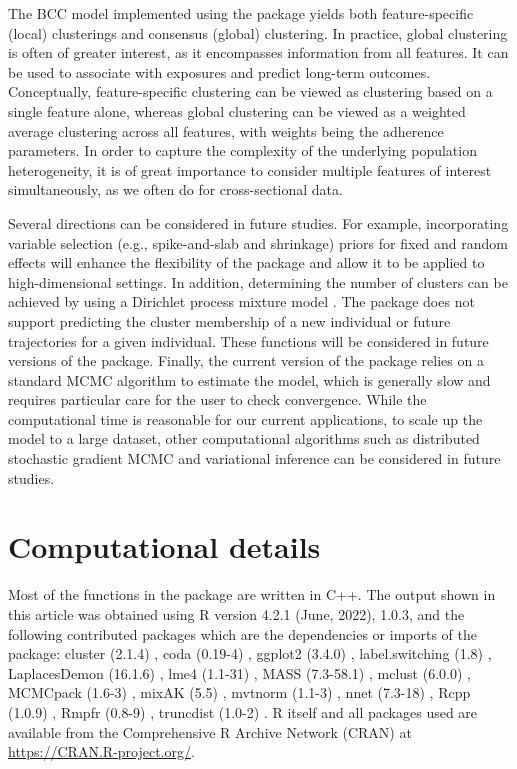The BCC model implemented using the  package yields both feature-specific (local) clusterings and consensus (global) clustering. In practice, global clustering is often of greater interest, as it encompasses information from all features. It can be used to associate with exposures and predict long-term outcomes. Conceptually, feature-specific clustering can be viewed as clustering based on a single feature alone, whereas global clustering can be viewed as a weighted average clustering across all features, with weights being the adherence parameters. In order to capture the complexity of the underlying population heterogeneity, it is of great importance to consider multiple features of interest simultaneously, as we often do for cross-sectional data. 

Several directions can be considered in future studies. For example, incorporating variable selection (e.g., spike-and-slab and shrinkage) priors \citep{Lu2021b, Lu2021} for fixed and random effects will enhance the flexibility of the package and allow it to be applied to high-dimensional settings. In addition, determining the number of clusters can be achieved by using a Dirichlet process mixture model \citep{Escobar1994, Lu2023a, Lu2024}. The package does not support predicting the cluster membership of a new individual or future trajectories for a given individual. These functions will be considered in future versions of the package. Finally, the current version of the  package relies on a standard MCMC algorithm to estimate the model, which is generally slow and requires particular care for the user to check convergence. While the computational time is reasonable for our current applications, to scale up the model to a large dataset, other computational algorithms such as distributed stochastic gradient MCMC \citep{Ahn2014} and variational inference \citep{Blei2017} can be considered in future studies.

\section*{Computational details}

Most of the functions in the  package are written in C++. The output shown in this article was obtained using R version 4.2.1 (June, 2022),  1.0.3, and the following contributed packages which are the dependencies or imports of the  package: cluster (2.1.4) \citep{Maechler2022}, coda (0.19-4) \citep{Martyn2006}, ggplot2 (3.4.0) \citep{Wickham2016}, label.switching (1.8) \citep{Papastamoulis2016}, LaplacesDemon (16.1.6) \citep{Hall2022}, lme4 (1.1-31) \citep{Bates2015}, MASS (7.3-58.1) \citep{Ripley2013}, mclust (6.0.0) \citep{Fraley2006}, MCMCpack (1.6-3) \citep{Martin2011}, mixAK (5.5) \citep{Komarek2014}, mvtnorm (1.1-3) \citep{Genz2021}, nnet (7.3-18) \citep{Ripley2016}, Rcpp (1.0.9) \citep{Eddelbuettel2011}, Rmpfr (0.8-9) \citep{Maechler2022a}, truncdist (1.0-2) \citep{Novomestky2016}. R itself and all packages used are available from the Comprehensive R Archive Network (CRAN) at \url{https://CRAN.R-project.org/}.

